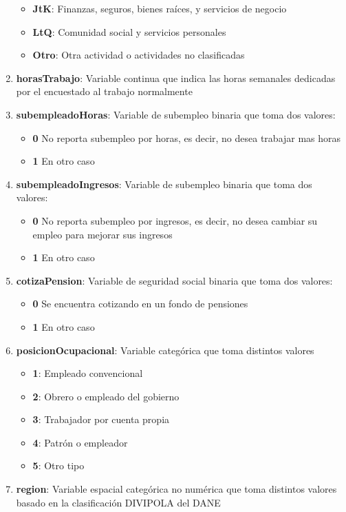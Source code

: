 \documentclass[12pt,a4paper]{article}
\begin{document}
\begin{enumerate}
\begin{itemize}
		\item \textbf{JtK}: Finanzas, seguros, bienes raíces, y servicios de negocio
		\item \textbf{LtQ}: Comunidad social y servicios personales
		\item \textbf{Otro}: Otra actividad o actividades no clasificadas
	\end{itemize}
		\item \textbf{horasTrabajo}: Variable continua que indica las horas semanales dedicadas por el encuestado al trabajo normalmente
		\item \textbf{subempleadoHoras}: Variable de subempleo binaria que toma dos valores:
		\begin{itemize}
			\item \textbf{0} No reporta subempleo por horas, es decir, no desea trabajar mas horas
			\item \textbf{1} En otro caso
		\end{itemize}
		\item \textbf{subempleadoIngresos}: Variable de subempleo binaria que toma dos valores:
		\begin{itemize}
			\item \textbf{0} No reporta subempleo por ingresos, es decir, no desea cambiar su empleo para mejorar sus ingresos
			\item \textbf{1} En otro caso
		\end{itemize}
		\item \textbf{cotizaPension}: Variable de seguridad social binaria que toma dos valores:
		\begin{itemize}
			\item \textbf{0} Se encuentra cotizando en un fondo de pensiones
			\item \textbf{1} En otro caso
		\end{itemize}
		\item \textbf{posicionOcupacional}: Variable categórica que toma distintos valores
		\begin{itemize}
			\item \textbf{1}: Empleado convencional
			\item \textbf{2}: Obrero o empleado del gobierno
			\item \textbf{3}: Trabajador por cuenta propia
			\item \textbf{4}: Patrón o empleador
			\item \textbf{5}: Otro tipo
		\end{itemize}
		\item \textbf{region}: Variable espacial categórica no numérica que toma distintos valores basado en la clasificación DIVIPOLA del DANE

\end{enumerate}
\end{document}
